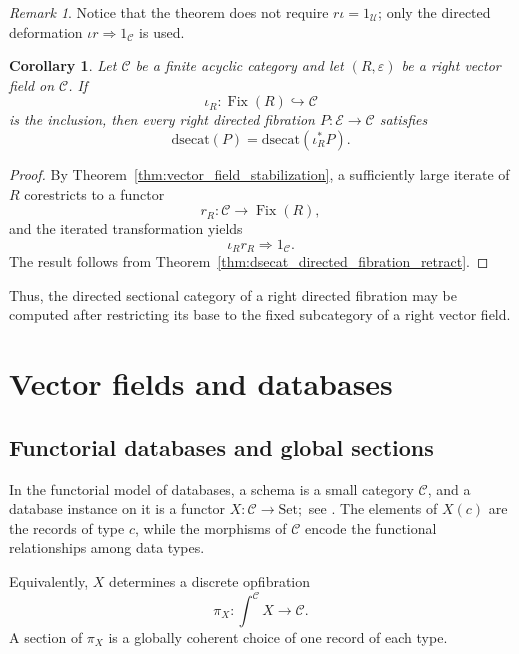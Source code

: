 \documentclass[12pt]{amsart}
\newtheorem{corollary}[teo]{Corollary}
\theoremstyle{definition}
\theoremstyle{remark}
\newtheorem{remark}[teo]{Remark}
\numberwithin{figure}{section}%
\newcommand{\CC}{\mathcal{C}}
\newcommand{\E}{\mathcal{E}}
\newcommand{\Sets}{\mathrm{Set}}
\newcommand{\Uc}{\mathcal{U}}
\begin{document}
\begin{remark}
    Notice that the theorem does not require \(r\iota=1_\Uc\); only the
directed deformation \(\iota r\Rightarrow1_\CC\) is used.
\end{remark}
\begin{corollary}\label{cor:dsecat_vector_field_reduction}
Let \(\CC\) be a finite acyclic category and let
\((R,\varepsilon)\) be a right vector field on \(\CC\). If
\[
\iota_R\colon\operatorname{Fix}(R)\hookrightarrow\CC
\]
is the inclusion, then every right directed fibration
\(P\colon\E\to\CC\) satisfies
\[
\mathrm{dsecat}(P)
=
\mathrm{dsecat}(\iota_R^*P).
\]
\end{corollary}

\begin{proof}
By Theorem~\ref{thm:vector_field_stabilization}, a sufficiently large
iterate of \(R\) corestricts to a functor
\[
r_R\colon\CC\longrightarrow\operatorname{Fix}(R),
\]
and the iterated transformation yields
\[
\iota_Rr_R\Rightarrow1_\CC.
\]
The result follows from
Theorem~\ref{thm:dsecat_directed_fibration_retract}.
\end{proof}

Thus, the directed sectional category of a right directed fibration may be
computed after restricting its base to the fixed subcategory of a right
vector field.

\section{Vector fields and databases}
\label{sec:databases_retractions}

\subsection{Functorial databases and global sections}
\label{subsec:functorial_databases_sections}

In the functorial model of databases, a schema is a small category
\(\CC\), and a database instance on it is a functor
\(
X\colon\CC\longrightarrow\Sets;
\)
see \cite{SpivakDataMigration,SpivakDatabaseQueries,SevenSketches}.
The elements of \(X(c)\) are the records of type \(c\), while the
morphisms of \(\CC\) encode the functional relationships among data
types.

Equivalently, \(X\) determines a discrete opfibration
\[
\pi_X\colon\int^\CC X\longrightarrow\CC.
\]
A section of \(\pi_X\) is a globally coherent choice of one record of
each type.
\end{document}
